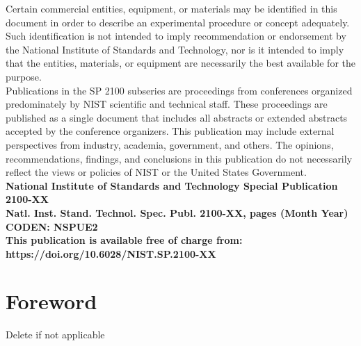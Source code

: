 \documentclass[12pt]{article}
\newcommand{\pubnumber}{2100-XX}
\newcommand{\DOI}{https://doi.org/10.6028/NIST.SP.2100-XX}
\newcommand{\monthyear}{Month Year}
\begin{document}
\begin{titlepage}
\begin{flushright}
\footnotesize  Certain commercial entities, equipment, or materials may be identified in this document in order to describe an experimental procedure or concept adequately. Such identification is not intended to imply recommendation or endorsement by the National Institute of Standards and Technology, nor is it intended to imply that the entities, materials, or equipment are necessarily the best available for the purpose.\\ 
\vspace{12pt}
\vspace{12pt}
Publications in the SP 2100 subseries are proceedings from conferences organized predominately by NIST scientific and technical staff. These proceedings are published as a single document that includes all abstracts or extended abstracts accepted by the conference organizers. This publication may include external perspectives from industry, academia, government, and others. The opinions, recommendations, findings, and conclusions in this publication do not necessarily reflect the views or policies of NIST or the United States Government.\\
\vfill
\normalsize \textbf{National Institute of Standards and Technology Special Publication \pubnumber\\ 
Natl. Inst. Stand. Technol. Spec. Publ. \pubnumber, \pageref{LastPage} pages (\monthyear)} \\
\textbf{CODEN: NSPUE2}\\
\vspace{12pt}
\textbf{This publication is available free of charge from: \DOI}
\vfill
\end{flushright}
\end{titlepage}
\section*{Foreword}
\normalsize Delete if not applicable\\
\end{document}
